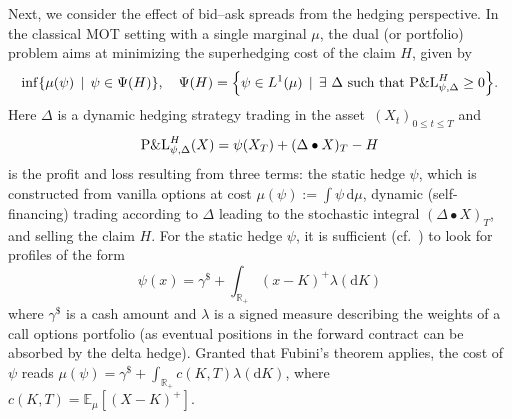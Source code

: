 \documentclass[11pt]{article}
\newcommand{\R}{\mathbb{R}} %
\theoremstyle{plain}
\theoremstyle{definition}
\theoremstyle{remark}
\newcommand{\E}{\mathbb{E}}
\newcommand*{\rd}{\mathrm{d}}
\newcommand*{\dd}{\, \rd}
\theoremstyle{plain}
\begin{document}
Next, we consider the effect of bid--ask spreads from the hedging perspective. 
In the classical MOT setting with a single marginal $\mu$, the dual (or portfolio) problem %
aims at minimizing the superhedging cost of the claim $H$, given by
\begin{equation*}
   \inf \{ \mu(\psi) \, \mid \, \psi \in \Psi(H) \}, \quad  %
    \Psi(H) = \Big\{ {\psi} \in L^1(\mu) \,\mid \, \exists \ {\Delta} \text{ such that  }  \textnormal{P\&L}_{\psi,\Delta}^H\ge 0  \Big\}.
\end{equation*}
Here $\Delta$ is a dynamic hedging strategy trading in the asset~$(X_t)_{0\leq t\leq T}$ and 
$$\textnormal{P\&L}_{\psi,\Delta}^H(X) = \psi(X_T) + (\Delta \bullet X)_T - H$$
is the profit and loss resulting from three terms: the static hedge $\psi$, which is constructed from vanilla options at cost $\mu(\psi):=\int \psi \dd\mu$, dynamic (self-financing) trading according to $\Delta$ leading to the stochastic integral $(\Delta \bullet X)_T$, and selling the claim $H$. For the static hedge $\psi$, it is sufficient (cf.~\cite{HLBook}) to look for profiles of the form 
\begin{equation}\label{eq:cashPlusCalls}
\psi(x) = \gamma^{\$} + \int_{\R_+}(x-K)^{+}\lambda(\rd K)
\end{equation}
where $\gamma^{\$}$ is a cash amount and $\lambda$ is a signed measure describing the weights of a call options portfolio (as eventual positions in the forward contract can be absorbed by the delta hedge). Granted that Fubini's theorem applies, 
the cost of $\psi$ reads 
$\mu(\psi) = \gamma^{\$} + \int_{\R_+}c(K,T)\lambda(\rd K)$, where $c(K,T) = \E_{\mu}[(X-K)^+]$. 
\end{document}

